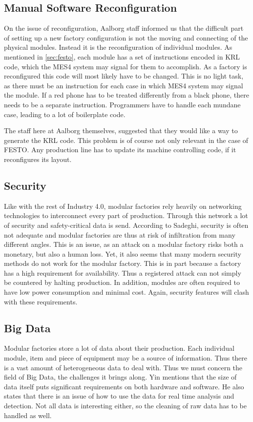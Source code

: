 \subsection{Manual Software Reconfiguration}
On the issue of reconfiguration, Aalborg staff informed us that the difficult part of setting up a new factory configuration is not the moving and connecting of the physical modules. Instead it is the reconfiguration of individual modules. As mentioned in \cref{sec:festo}, each module has a set of instructions encoded in KRL code, which the MES4 system may signal for them to accomplish. As a factory is reconfigured this code will most likely have to be changed. This is no light task, as there must be an instruction for each case in which MES4 system may signal the module. If a red phone has to be treated differently from a black phone, there needs to be a separate instruction. Programmers have to handle each mundane case, leading to a lot of boilerplate code. 

The staff here at Aalborg themselves, suggested that they would like a way to generate the KRL code. This problem is of course not only relevant in the case of FESTO. Any production line has to update its machine controlling code, if it reconfigures its layout.

\subsection{Security}
Like with the rest of Industry 4.0, modular factories rely heavily on networking technologies to interconnect every part of production. Through this network a lot of security and safety-critical data is send. According to Sadeghi\cite{Sadeghi2015}, security is often not adequate and modular factories are thus at risk of infiltration from many different angles. This is an issue, as an attack on a modular factory risks both a monetary, but also a human loss. Yet, it also seems that many modern security methods do not work for the modular factory. This is in part because a factory has a high requirement for availability. Thus a registered attack can not simply be countered by halting production. In addition, modules are often required to have low power consumption and minimal cost. Again, security features will clash with these requirements. 

\subsection{Big Data}
Modular factories store a lot of data about their production. Each individual module, item and piece of equipment may be a source of information. Thus there is a vast amount of heterogeneous data to deal with. Thus we must concern the field of Big Data, the challenges it brings along. Yin \cite{Yin2015} mentions that the size of data itself puts significant requirements on both hardware and software. He also states that there is an issue of how to use the data for real time analysis and detection. Not all data is interesting either, so the cleaning of raw data has to be handled as well. 

